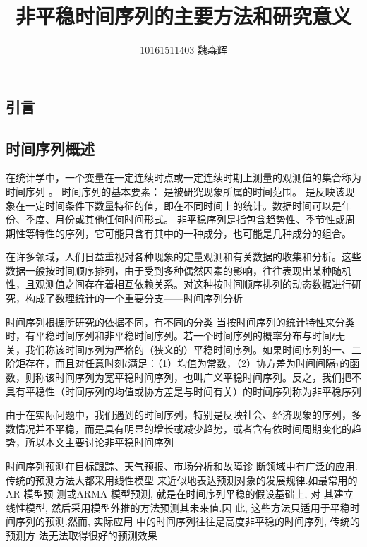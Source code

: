 \documentclass[12pt, a4paper]{ctexart}
\title{非平稳时间序列的主要方法和研究意义}
\author{10161511403 魏森辉}
\date{}
\begin{document}
\maketitle{}
\tableofcontents %
\thispagestyle{empty} %
\newpage
\setcounter{page}{1} %

\begin{flushleft}
    
\section{引言}
\subsection{时间序列概述}

在统计学中，一个变量在一定连续时点或一定连续时期上测量的观测值的集合称为时间序列 。
时间序列的基本要素： 是被研究现象所属的时间范围。
是反映该现象在一定时间条件下数量特征的值，即在不同时间上的统计。数据时间可以是年份、季度、月份或其他任何时间形式。
非平稳序列是指包含趋势性、季节性或周期性等特性的序列，它可能只含有其中的一种成分，也可能是几种成分的组合。

在许多领域，人们日益重视对各种现象的定量观测和有关数据的收集和分析。这些数据一般按时间顺序排列，由于受到多种偶然因素的影响，往往表现出某种随机性，且观测值之间存在着相互依赖关系。对这种按时间顺序排列的动态数据进行研究，构成了数理统计的一个重要分支——时间序列分析

时间序列根据所研究的依据不同，有不同的分类
当按时间序列的统计特性来分类时，有平稳时间序列和非平稳时间序列。若一个时间序列的概率分布与时间$t$无关，我们称该时间序列为严格的（狭义的）平稳时间序列。如果时间序列的一、二阶矩存在，而且对任意时刻$t$满足：（1）均值为常数，（2）协方差为时间间隔$\tau$的函数，则称该时间序列为宽平稳时间序列，也叫广义平稳时间序列。反之，我们把不具有平稳性（时间序列的均值或协方差是与时间有关）的时间序列称为非平稳序列

由于在实际问题中，我们遇到的时间序列，特别是反映社会、经济现象的序列，多数情况并不平稳，而是具有明显的增长或减少趋势，或者含有依时间周期变化的趋势，所以本文主要讨论非平稳时间序列


时间序列预测在目标跟踪、天气预报、市场分析和故障诊
断领域中有广泛的应用.传统的预测方法大都采用线性模型
来近似地表达预测对象的发展规律.如最常用的 AR 模型预
测或ARMA 模型预测, 就是在时间序列平稳的假设基础上, 对
其建立线性模型, 然后采用模型外推的方法预测其未来值.因
此, 这些方法只适用于平稳时间序列的预测.然而, 实际应用
中的时间序列往往是高度非平稳的时间序列, 传统的预测方
法无法取得很好的预测效果



\end{flushleft}
\end{document}
